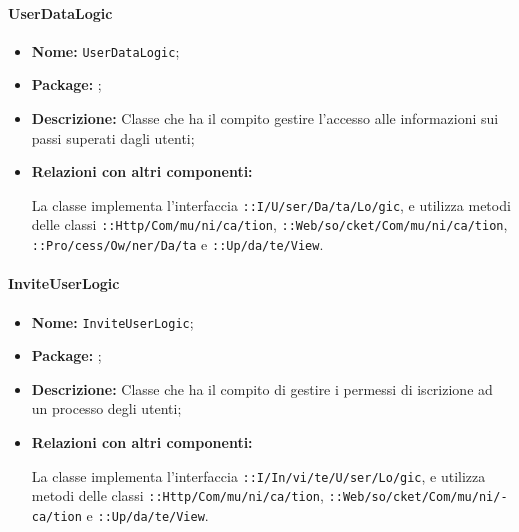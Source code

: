 \paragraph{UserDataLogic}
\begin{flushleft}
\begin{itemize}
\item \textbf{Nome:} \texttt{UserDataLogic};
\item \textbf{Package:} \texttt{\logicAdmin{}};
\item \textbf{Descrizione:} Classe che ha il compito gestire l'accesso alle informazioni sui passi superati dagli utenti;
\item \textbf{Relazioni con altri componenti:}
\begin{sloppypar}
La classe implementa l'interfaccia \texttt{\iLogicAdmin{}::I\fshyp{}U\fshyp{}ser\fshyp{}Da\fshyp{}ta\fshyp{}Lo\fshyp{}gic}, e utilizza metodi delle classi \texttt{\serverCommunication{}::Http\fshyp{}Com\fshyp{}mu\fshyp{}ni\fshyp{}ca\fshyp{}tion}, \texttt{\serverCommunication{}::Web\fshyp{}so\fshyp{}cket\fshyp{}Com\fshyp{}mu\fshyp{}ni\fshyp{}ca\fshyp{}tion}, \texttt{\modelAdmin{}::Pro\fshyp{}cess\fshyp{}Ow\fshyp{}ner\fshyp{}Da\fshyp{}ta} e \texttt{\viewAdmin{}::Up\fshyp{}da\fshyp{}te\fshyp{}View}.
\end{sloppypar}
\end{itemize}
\end{flushleft}

\paragraph{InviteUserLogic}
\begin{flushleft}
\begin{itemize}
\item \textbf{Nome:} \texttt{InviteUserLogic};
\item \textbf{Package:} \texttt{\logicAdmin{}};
\item \textbf{Descrizione:} Classe che ha il compito di gestire i permessi di iscrizione ad un processo degli utenti;
\item \textbf{Relazioni con altri componenti:}
\begin{sloppypar}
La classe implementa l'interfaccia \texttt{\iLogicAdmin{}::I\fshyp{}In\fshyp{}vi\fshyp{}te\fshyp{}U\fshyp{}ser\fshyp{}Lo\fshyp{}gic}, e utilizza metodi delle classi \texttt{\serverCommunication{}::Http\fshyp{}Com\fshyp{}mu\fshyp{}ni\fshyp{}ca\fshyp{}tion}, \texttt{\serverCommunication{}::Web\fshyp{}so\fshyp{}cket\fshyp{}Com\fshyp{}mu\fshyp{}ni\fshyp{}ca\fshyp{}tion} e \texttt{\viewAdmin{}::Up\fshyp{}da\fshyp{}te\fshyp{}View}.
\end{sloppypar}
\end{itemize}
\end{flushleft}